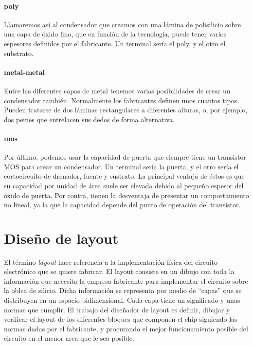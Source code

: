\paragraph{poly}
Llamaremos así al condensador que creamos con una lámina de polisilicio sobre una
capa de óxido fino, que en función de la tecnología, puede tener varios espesores
definidos por el fabricante. Un terminal sería el poly, y el otro el substrato.

\paragraph{metal-metal}
Entre las diferentes capas de metal tenemos varias posibilidades de crear un condensador
también. Normalmente los fabricantes definen unos cuantos tipos. Pueden tratarse de
dos láminas rectangulares a diferentes alturas, o, por ejemplo, dos peines que
entrelacen sus dedos de forma alternativa.

\paragraph{mos}
Por último, podemos usar la capacidad de puerta que siempre tiene un transistor MOS
para crear un condensador. Un terminal sería la puerta, y el otro sería el cortocircuito
de drenador, fuente y sustrato. La principal ventaja de éstos es que su capacidad por
unidad de área suele ser elevada debido al pequeño espesor del óxido de puerta. Por contra,
tienen la desventaja de presentar un comportamiento no lineal, ya la que la capacidad
depende del punto de operación del transistor.

\section{Diseño de layout}\label{cap:layout}

\paragraph{}
El término \textit{layout} hace referencia a la implementación física del circuito
electrónico que se quiere fabricar. El layout consiste en un dibujo con toda
la información que necesita la empresa fabricante para implementar el circuito
sobre la oblea de silicio. Dicha información se representa por medio de ``capas''
que se distribuyen en un espacio bidimensional. Cada capa tiene un significado y
unas normas que cumplir. El trabajo del diseñador de layout es definir, dibujar y
verificar el layout de los diferentes bloques que componen el chip siguiendo
las normas dadas por el fabricante, y procurando el mejor funcionamiento posible
del circuito en el menor area que le sea posible.

